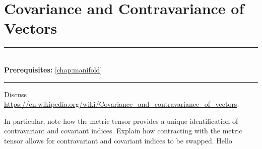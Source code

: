\documentclass[book.tex]{subfiles}
\begin{document}
\chapter{Covariance and Contravariance of Vectors}
\label{chap:covariance_contravariance}
\noindent\rule{11cm}{0.4pt} \\
\textbf{Prerequisites:} \autoref{chap:manifold} \\ \noindent\rule{11cm}{0.4pt}
\vspace{5mm}

Discuss
\url{https://en.wikipedia.org/wiki/Covariance_and_contravariance_of_vectors}.

In particular, note how the metric tensor provides a unique identification of contravariant and covariant indices. Explain how contracting with the metric tensor allows for contravariant and covariant indices to be swapped. Hello
\end{document}
